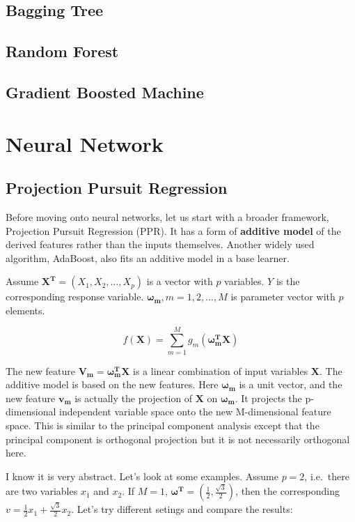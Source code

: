\documentclass[12pt,]{krantz}
\theoremstyle{definition}
\theoremstyle{definition}
\theoremstyle{definition}
\theoremstyle{remark}
\begin{document}
\section{Bagging Tree}\label{bagging-tree-1}

\section{Random Forest}\label{random-forest}

\section{Gradient Boosted Machine}\label{gradient-boosted-machine}

\chapter{Neural Network}\label{neural-network}

\section{Projection Pursuit
Regression}\label{projection-pursuit-regression}

Before moving onto neural networks, let us start with a broader
framework, Projection Pursuit Regression (PPR). It has a form of
\textbf{additive model} of the derived features rather than the inputs
themselves. Another widely used algorithm, AdaBoost, also fits an
additive model in a base learner.

Assume \(\mathbf{X^{T}}=(X_1,X_2,\dots,X_p)\) is a vector with \(p\)
variables. \(Y\) is the corresponding response variable.
\(\mathbf{\omega_{m}},m=1,2,\dots,M\) is parameter vector with \(p\)
elements.

\[f(\mathbf{X})=\sum_{m=1}^{M}g_{m}(\mathbf{\omega_{m}^{T}X})\]

The new feature \(\mathbf{V_{m}}=\mathbf{\omega_{m}^{T}X}\) is a linear
combination of input variables \(\mathbf{X}\). The additive model is
based on the new features. Here \(\mathbf{\omega_{m}}\) is a unit
vector, and the new feature \(\mathbf{v_m}\) is actually the projection
of \(\mathbf{X}\) on \(\mathbf{\omega_{m}}\). It projects the
p-dimensional independent variable space onto the new M-dimensional
feature space. This is similar to the principal component analysis
except that the principal component is orthogonal projection but it is
not necessarily orthogonal here.

I know it is very abstract. Let's look at some examples. Assume \(p=2\),
i.e.~there are two variables \(x_1\) and \(x_2\). If \(M=1\),
\(\mathbf{\omega^{T}}=(\frac{1}{2},\frac{\sqrt{3}}{2})\), then the
corresponding \(v=\frac{1}{2}x_{1}+\frac{\sqrt{3}}{2}x_{2}\). Let's try
different setings and compare the results:
\end{document}
